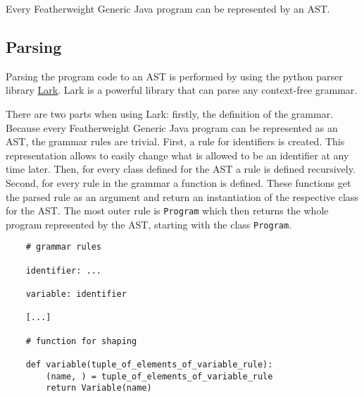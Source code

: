 Every Featherweight Generic Java program can be represented by an AST.

\subsection{Parsing}

Parsing the program code to an AST is performed by using the python parser library \href{https://lark-parser.readthedocs.io/en/stable/}{Lark}.
Lark is a powerful library that can parse any context-free grammar.

There are two parts when using Lark:
firstly, the definition of the grammar.
Because every Featherweight Generic Java program can be represented as an AST, the grammar rules are trivial.
First, a rule for identifiers is created. This representation allows to easily change what is allowed to be an identifier at any time later.
Then, for every class defined for the AST a rule is defined recursively.
Second, for every rule in the grammar a function is defined. These functions get the parsed rule as an argument and return an instantiation of the respective class for the AST.
The most outer rule is \verb|Program| which then returns the whole program represented by the AST, starting with the class \verb|Program|.

\begin{verbatim}
    # grammar rules

    identifier: ...

    variable: identifier

    [...]

    # function for shaping

    def variable(tuple_of_elements_of_variable_rule):
        (name, ) = tuple_of_elements_of_variable_rule
        return Variable(name)
\end{verbatim}
